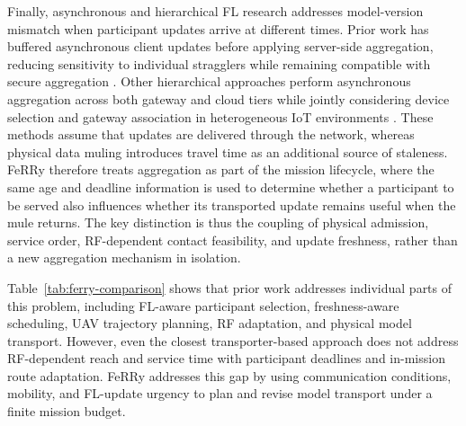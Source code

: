 \documentclass[conference]{IEEEtran}
\begin{document}
Finally, asynchronous and hierarchical FL research addresses model-version mismatch when participant updates arrive at different times. Prior work has buffered asynchronous client updates before applying server-side aggregation, reducing sensitivity to individual stragglers while remaining compatible with secure aggregation \cite{nguyen2022federated}. Other hierarchical approaches perform asynchronous aggregation across both gateway and cloud tiers while jointly considering device selection and gateway association in heterogeneous IoT environments \cite{yu2023async}. These methods assume that updates are delivered through the network, whereas physical data muling introduces travel time as an additional source of staleness. FeRRy therefore treats aggregation as part of the mission lifecycle, where the same age and deadline information is used to determine whether a participant to be served also influences whether its transported update remains useful when the mule returns. The key distinction is thus the coupling of physical admission, service order, RF-dependent contact feasibility, and update freshness, rather than a new aggregation mechanism in isolation.

Table~\ref{tab:ferry-comparison} shows that prior work addresses individual parts of this problem, including FL-aware participant selection, freshness-aware scheduling, UAV trajectory planning, RF adaptation, and physical model transport. However, even the closest transporter-based approach does not address RF-dependent reach and service time with participant deadlines and in-mission route adaptation. FeRRy addresses this gap by using communication conditions, mobility, and FL-update urgency to plan and revise model transport under a finite mission budget.
\end{document}
